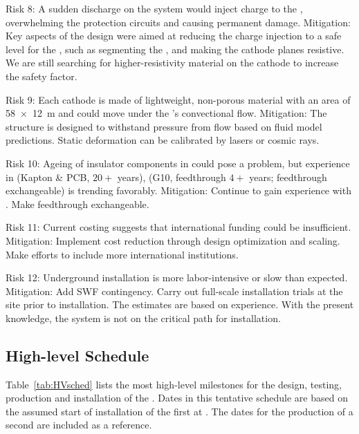 Risk 8: A sudden discharge on the  system would inject charge to the  , overwhelming the protection circuits and causing permanent damage. Mitigation: Key aspects of the  design were aimed at reducing the charge injection to a safe level for the , such as segmenting the , and making the cathode planes resistive.  We are still searching for higher-resistivity material on the cathode to increase the safety factor. 

Risk 9:  Each cathode is made of lightweight, non-porous material with an area of \SI{58x12}{m} and could move under the 's convectional flow.  Mitigation: The  structure is designed to withstand pressure from  flow based on fluid model predictions. Static deformation can be calibrated by lasers or cosmic rays.

Risk 10: Ageing of insulator components in  could %
pose a problem,  but  experience in  (Kapton \& PCB, $20+$ years),  (G10, feedthrough $4+$ years; feedthrough exchangeable) is trending favorably. Mitigation: %
Continue to gain experience with . Make feedthrough exchangeable.

Risk 11: Current costing suggests that international funding could be %
insufficient. Mitigation: Implement cost reduction through design optimization and scaling. Make efforts to include more international %
institutions. 

Risk 12: Underground installation is more labor-intensive or slow than expected. Mitigation: Add SWF  contingency. Carry out full-scale installation trials at the   site prior to installation. The estimates are based on  experience. With the present knowledge, the  system is not on the critical path for installation.

\subsection{High-level Schedule}
\label{sec:fdsp-hv-org-cs}


Table~\ref{tab:HVsched} lists the most high-level milestones for the design, testing, production and installation of the  . Dates in this tentative schedule are based on the assumed start of installation of the first  at . The dates for the  production of a second  are %
included as a reference.

